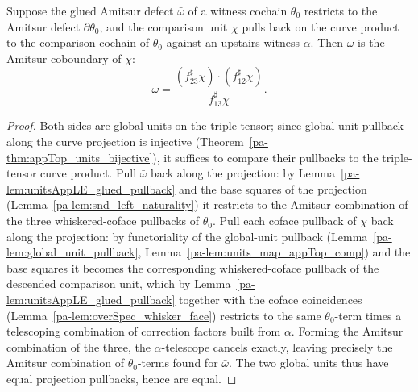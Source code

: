 \begin{theorem}
  \label{pa-thm:glued_defect_eq_amitsur_coboundary}
  \leanok

  Suppose the glued Amitsur defect \(\bar\omega\) of a witness cochain \(\theta_0\) restricts to
  the Amitsur defect \(\partial\theta_0\), and the comparison unit \(\chi\) pulls back on the
  curve product to the comparison cochain of \(\theta_0\) against an upstairs witness
  \(\alpha\). Then \(\bar\omega\) is the Amitsur coboundary of \(\chi\):
  \[
    \bar\omega
      = \frac{(f_{23}^{\sharp}\chi) \cdot (f_{12}^{\sharp}\chi)}{f_{13}^{\sharp}\chi} .
  \]
\end{theorem}
\begin{proof}
  \leanok
  Both sides are global units on the triple tensor; since global-unit pullback along the curve
  projection is injective (Theorem~\ref{pa-thm:appTop_units_bijective}), it suffices to compare
  their pullbacks to the triple-tensor curve product. Pull \(\bar\omega\) back along the
  projection: by Lemma~\ref{pa-lem:unitsAppLE_glued_pullback} and the base squares of the
  projection (Lemma~\ref{pa-lem:snd_left_naturality}) it restricts to the Amitsur combination of
  the three whiskered-coface pullbacks of \(\theta_0\). Pull each coface pullback of \(\chi\)
  back along the projection: by functoriality of the global-unit pullback
  (Lemma~\ref{pa-lem:global_unit_pullback}, Lemma~\ref{pa-lem:units_map_appTop_comp}) and the base
  squares it becomes the corresponding whiskered-coface pullback of the descended comparison
  unit, which by Lemma~\ref{pa-lem:unitsAppLE_glued_pullback} together with the coface coincidences
  (Lemma~\ref{pa-lem:overSpec_whisker_face}) restricts to the same \(\theta_0\)-term times a
  telescoping combination of correction factors built from \(\alpha\). Forming the Amitsur
  combination of the three, the \(\alpha\)-telescope cancels exactly, leaving precisely the
  Amitsur combination of \(\theta_0\)-terms found for \(\bar\omega\). The two global units thus
  have equal projection pullbacks, hence are equal.
\end{proof}

